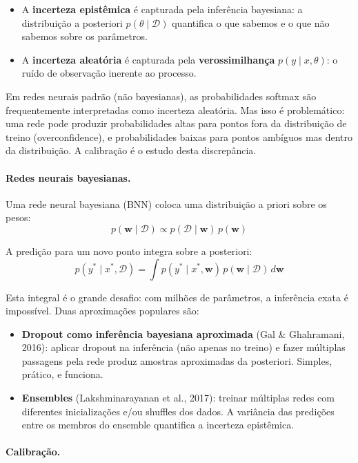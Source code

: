 \documentclass{tufte-handout}
\begin{document}
\begin{itemize}
    \item A \textbf{incerteza epistêmica} é capturada pela inferência bayesiana: a
    distribuição a posteriori $p(\theta \mid \mathcal{D})$ quantifica o que sabemos e
    o que não sabemos sobre os parâmetros.
    \item A \textbf{incerteza aleatória} é capturada pela \textbf{verossimilhança}
    $p(y \mid x, \theta)$: o ruído de observação inerente ao processo.
\end{itemize}

Em redes neurais padrão (não bayesianas), as probabilidades softmax são frequentemente
interpretadas como incerteza aleatória. Mas isso é problemático: uma rede pode produzir
probabilidades altas para pontos fora da distribuição de treino (overconfidence), e
probabilidades baixas para pontos ambíguos mas dentro da distribuição. A calibração é
o estudo desta discrepância.

\paragraph{Redes neurais bayesianas.}

Uma rede neural bayesiana (BNN) coloca uma distribuição a priori sobre os pesos:
\[
p(\mathbf{w} \mid \mathcal{D}) \propto p(\mathcal{D} \mid \mathbf{w}) \, p(\mathbf{w})
\]

A predição para um novo ponto integra sobre a posteriori:
\[
p(y^* \mid x^*, \mathcal{D}) = \int p(y^* \mid x^*, \mathbf{w}) \, p(\mathbf{w} \mid \mathcal{D}) \, d\mathbf{w}
\]

Esta integral é o grande desafio: com milhões de parâmetros, a inferência exata é
impossível. Duas aproximações populares são:

\begin{itemize}
    \item \textbf{Dropout como inferência bayesiana aproximada} (Gal \& Ghahramani,
    2016): aplicar dropout na inferência (não apenas no treino) e fazer múltiplas
    passagens pela rede produz amostras aproximadas da posteriori. Simples,
    prático, e funciona.
    \item \textbf{Ensembles} (Lakshminarayanan et al., 2017): treinar múltiplas redes
    com diferentes inicializações e/ou shuffles dos dados. A variância das predições
    entre os membros do ensemble quantifica a incerteza epistêmica.
\end{itemize}

\paragraph{Calibração.}
\end{document}
